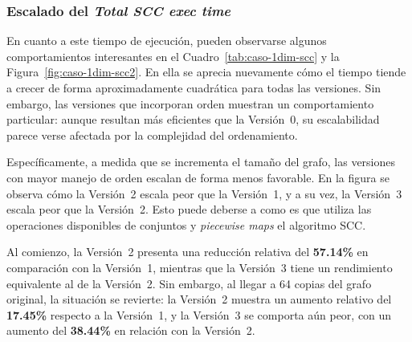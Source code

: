 \subsubsection{Escalado del \textit{Total SCC exec time}}

En cuanto a este tiempo de ejecución, pueden observarse algunos comportamientos interesantes en el Cuadro~\ref{tab:caso-1dim-scc} y la Figura~\ref{fig:caso-1dim-scc2}. En ella se aprecia nuevamente cómo el tiempo tiende a crecer de forma aproximadamente cuadrática para todas las versiones. Sin embargo, las versiones que incorporan orden muestran un comportamiento particular: aunque resultan más eficientes que la Versión~0, su escalabilidad parece verse afectada por la complejidad del ordenamiento.

Específicamente, a medida que se incrementa el tamaño del grafo, las versiones con mayor manejo de orden escalan de forma menos favorable. En la figura se observa cómo la Versión~2 escala peor que la Versión~1, y a su vez, la Versión~3 escala peor que la Versión~2. Esto puede deberse a como es que utiliza las operaciones disponibles de conjuntos y \textit{piecewise maps} el algoritmo SCC.

Al comienzo, la Versión~2 presenta una reducción relativa del \textbf{57{.}14\%} en comparación con la Versión~1, mientras que la Versión~3 tiene un rendimiento equivalente al de la Versión~2. Sin embargo, al llegar a 64 copias del grafo original, la situación se revierte: la Versión~2 muestra un aumento relativo del \textbf{17{.}45\%} respecto a la Versión~1, y la Versión~3 se comporta aún peor, con un aumento del \textbf{38{.}44\%} en relación con la Versión~2.

\begin{table}[ht]
\centering
{}
\caption{Cuadro comparativo del \textit{Total SCC exec time} de las diferentes versiones planteadas bajo un caso de prueba en una dimensión, variando el tamaño del caso de prueba}
\label{tab:caso-1dim-scc}
\end{table}



